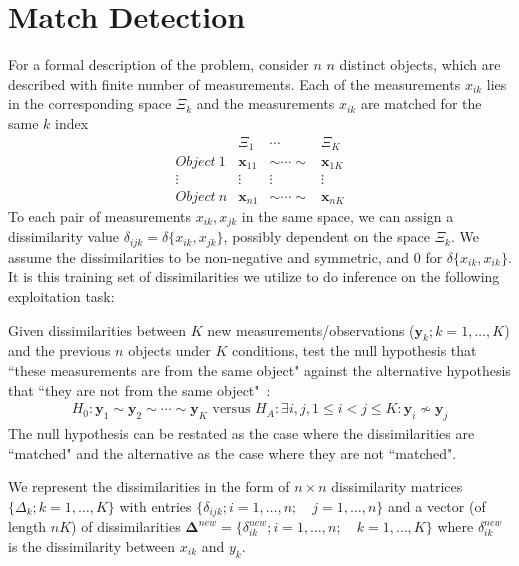 \documentclass[12pt,oneside,final]{thesis}\usepackage[]{graphicx}\usepackage[]{color}
\begin{document}
\section{Match Detection}


For a formal description of the problem, consider $n$  $n$ distinct objects, which are described with finite number of measurements. Each of the measurements $x_{ik}$ lies in  the corresponding space $\Xi_k$ and the  measurements $x_{ik}$ are matched for the same $k$ index
\[  \begin{array}{cccc}
        & \Xi_1 & \cdots & \Xi_K\\
        Object ~ 1 & \bm{x}_{11} & \sim \cdots \sim & \bm{x}_{1K} \\
        \vdots & \vdots & \vdots & \vdots \\
        Object ~ n & \bm{x}_{n1} & \sim \cdots \sim & \bm{x}_{nK}
      \end{array}      
\]
To each pair of measurements $x_{ik},x_{jk}$ in the same space, we can assign a dissimilarity value $\delta_{ijk}=\delta\{x_{ik},x_{jk}\}$, possibly dependent on the space $\Xi_k$. We assume the dissimilarities to be non-negative and  symmetric, and 0 for $\delta\{x_{ik},x_{ik}\}$.  It is this training set of  dissimilarities we utilize to do inference on the following exploitation task:

 Given dissimilarities between  $K$ new measurements/observations ($\bm{y}_{k};k=1,\ldots,K$) and the previous $n$ objects under $K$ conditions, 
test the null hypothesis  that ``these measurements are from the same  object"  against the alternative hypothesis that ``they are not  from the same  object"~\cite{JOFC}:
    \[
\begin{array}{l}
    H_0: \bm{y}_{1} \sim \bm{y}_{2} \sim \cdots \sim \bm{y}_{K}
 \text{ versus } 
 H_A: \exists i, j , 1\leq i < j \leq K :\bm{y}_{i} \nsim \bm{y}_{j}  
\end{array}
\]
 The null hypothesis can be restated as the case where the dissimilarities are ``matched" and the alternative as the case where they are not ``matched".

We represent the dissimilarities in the form  of $n \times n$  dissimilarity matrices $\{\Delta_k;k=1,\ldots,K\}$ with entries $\{\delta_{ijk} ;  i=1,\ldots,n;\quad j=1,\ldots,n\}$  and a  vector (of length $nK$) of dissimilarities  $\mathbf{\Delta}^{new}=\{ \delta_{ik}^{new}; i=1,\ldots, n;\quad k=1,\ldots,K\}  $  where $\delta_{ik}^{new} $ is the dissimilarity  between  $x_{ik}$ and $y_k$.
 
\end{document}
